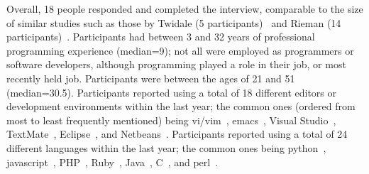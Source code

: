 \documentclass[smallextended]{svjour3}
\begin{document}
Overall, 18 people responded and completed the interview, comparable to the
size of similar studies such as those by Twidale (5 participants)~\cite{twidale05}
and Rieman (14 participants)~\cite{rieman}.
Participants had between 3 and 32 years of professional programming experience (median=9);
not all were employed as programmers or software developers,
although programming played a role in their job, or most recently held job. 
Participants were between the ages of 21 and 51 (median=30.5). 
Participants reported using a total of 18 different editors or development
environments within the last year; the common ones (ordered from
most to least frequently mentioned) being vi/vim~\cite{vim}, emacs~\cite{emacs},
Visual Studio~\cite{visualstudio}, TextMate~\cite{textmate}, Eclipse~\cite{eclipse}, and
Netbeans~\cite{netbeans}. 
Participants reported using a total of 24 different languages within the last year;
the common ones being python~\cite{python}, javascript~\cite{javascript}, PHP~\cite{php}, 
Ruby~\cite{ruby}, Java~\cite{java}, C~\cite{c}, and perl~\cite{perl}.

   	\newcommand\catA{\Circle\xspace}
   	\newcommand\catB{\LEFTCIRCLE\xspace}
   	\newcommand\catC{\CIRCLE\xspace}
   	
   	\newcommand\catLess{$-$\xspace}
   	\newcommand\catEq{$\approx$\xspace}
   	\newcommand\catMore{$+$\xspace}
\end{document}
